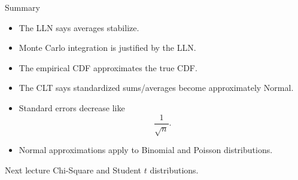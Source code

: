 \begin{frame}{Summary}
\begin{itemize}
    \item The LLN says averages stabilize.

    \item Monte Carlo integration is justified by the LLN.

    \item The empirical CDF approximates the true CDF.

    \item The CLT says standardized sums/averages become approximately Normal.

    \item Standard errors decrease like
    \[
    \frac1{\sqrt n}.
    \]

    \item Normal approximations apply to Binomial and Poisson distributions.
\end{itemize}

\vspace{0.25cm}

\begin{keybox}{Next lecture}
Chi-Square and Student $t$ distributions.
\end{keybox}
\end{frame}